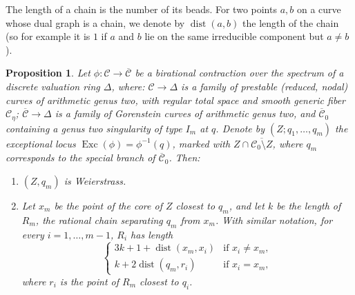 \documentclass[11pt]{amsart}
\renewcommand{\to}{\rightarrow}
\newcommand{\dvr}{\Delta}
\newcommand{\dist}{\operatorname{dist}}
\newcommand{\Exc}{\operatorname{Exc}}
\theoremstyle{plain}
\newtheorem{prop}[thm]{Proposition}
\theoremstyle{definition}
\begin{document}
The length of a chain is the number of its beads. For two points $a,b$ on a curve whose dual graph is a chain, we denote by $\dist(a,b)$ the length of the chain (so for example it is $1$ if $a$ and $b$ lie on the same irreducible component but $a\neq b$).

\begin{prop}\label{prop:tailI}
 Let $\phi\colon\mathcal C\to\overline{\mathcal C}$ be a birational contraction over the spectrum of a discrete valuation ring $\dvr$, where: $\mathcal C\to \dvr$ is a family of prestable (reduced, nodal) curves of arithmetic genus two, with regular total space and smooth generic fiber $\mathcal C_{\eta}$; $\overline{\mathcal C}\to\dvr$ is a family of Gorenstein curves of arithmetic genus two, and $\overline{\mathcal C}_0$ containing a genus two singularity of type $I_m$ at $q$. Denote by $(Z;q_1,\ldots,q_m)$ the exceptional locus $\Exc(\phi)=\phi^{-1}(q)$, marked with $Z\cap\overline{\mathcal C_0\setminus Z}$, where $q_m$ corresponds to the special branch of $\overline{\mathcal C}_0$. Then:
 \begin{enumerate}[leftmargin=.6cm]
  \item $(Z,q_m)$ is Weierstrass.
  \item Let $x_m$ be the point of the core of $Z$ closest to $q_m$, and let $k$ be the length of $R_m$, the rational chain separating $q_m$ from $x_m$. With similar notation, for every $i=1,\ldots,m-1$, $R_i$ has length 
  \begin{equation*}
  \begin{cases}
   3k+1+\dist(x_m,x_i) & \text{if } x_i\neq x_m,\\
   k+2\dist(q_m,r_i)  & \text{if } x_i=x_m,
  \end{cases} 
  \end{equation*}
 where $r_i$ is the point of $R_m$ closest to $q_i$.
 \end{enumerate}
\end{prop}
\end{document}
